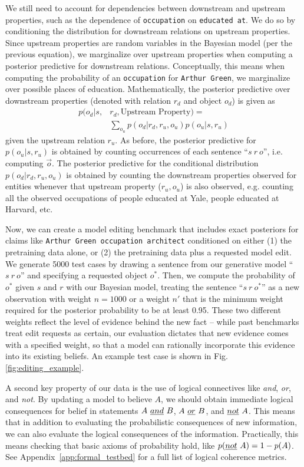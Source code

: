 \documentclass[11pt,a4paper]{article}
\begin{document}
We still need to account for dependencies between downstream and upstream properties, such as the dependence of \texttt{occupation} on \texttt{educated at}. We do so by conditioning the distribution for downstream relations on upstream properties. Since upstream properties are random variables in the Bayesian model (per the previous equation), we marginalize over upstream properties when computing a posterior predictive for downstream relations. Conceptually, this means when computing the probability of an \texttt{occupation} for \texttt{Arthur Green}, we marginalize over possible places of education. Mathematically, the posterior predictive over downstream properties (denoted with relation $r_d$ and object $o_d$) is given as
\begin{align*}
    p(o_d|s,& r_d, \textrm{Upstream Property}) = \\ 
    & \sum_{o_u} p(o_d|r_d, r_u, o_u) p(o_u|s, r_u)
\end{align*}
\noindent given the upstream relation $r_u$. 
As before, the posterior predictive for $p(o_u|s, r_u)$ is obtained by counting occurrences of each sentence ``$s \ r \ o$'', i.e. computing $\vec{o}$. 
The posterior predictive for the conditional distribution $p(o_d|r_d, r_u, o_u)$ is obtained by counting the downstream properties observed for entities whenever that upstream property ($r_u, o_u$) is also observed, e.g. counting all the observed occupations of people educated at Yale, people educated at Harvard, etc.

Now, we can create a model editing benchmark that includes exact posteriors for claims like \texttt{Arthur Green occupation architect} conditioned on either (1) the pretraining data alone, or (2) the pretraining data plus a requested model edit. We generate 5000 test cases by drawing a sentence from our generative model ``$s \ r \ o$'' and specifying a requested object $o^*$. Then, we compute the probability of $o^*$ given $s$ and $r$ with our Bayesian model, treating the sentence ``$s \ r \ o^*$'' as a new observation with weight $n=1000$ or a weight $n'$ that is the minimum weight required for the posterior probability to be at least 0.95. These two different weights reflect the level of evidence behind the new fact -- while past benchmarks treat edit requests as certain, our evaluation dictates that new evidence comes with a specified weight, so that a model can rationally incorporate this evidence into its existing beliefs. An example test case is shown in Fig. \ref{fig:editing_example}.

A second key property of our data is the use of logical connectives like \emph{and}, \emph{or}, and \emph{not}. By updating a model to believe $A$, we should obtain immediate logical consequences for belief in statements $A \ \emph{and} \ B$,  $A \ \emph{or} \ B$, and $\emph{not} \ A$. This means that in addition to evaluating the probabilistic consequences of new information, we can also evaluate the logical consequences of the information. Practically, this means checking that basic axioms of probability hold, like $p(\emph{not} \ A) = 1 - p(A)$. See Appendix~\ref{app:formal_testbed} for a full list of logical coherence metrics.
\end{document}
